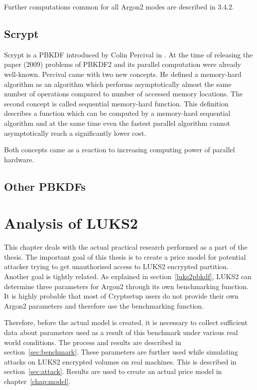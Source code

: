 \documentclass[nolof]{fithesis3}
\begin{document}
Further computations common for all Argon2 modes are described in \parencite{argon2draft}{3.4.2}.

\section{Scrypt}
Scrypt is a PBKDF introduced by Colin Percival in \parencite{memoryhard}. At the time of releasing the paper (2009) problems of PBKDF2 and its parallel computation were already well-known. Percival came with two new concepts. He defined a memory-hard algorithm as an algorithm which performs asymptotically almost the same number of operations compared to number of accessed memory locations. The second concept is called sequential memory-hard function. This definition describes a function which can be computed by a memory-hard sequential algorithm and at the same time even the fastest parallel algorithm cannot asymptotically reach a significantly lower cost.

Both concepts came as a reaction to increasing computing power of parallel hardware. 

\section{Other PBKDFs}

\chapter{Analysis of LUKS2}
\label{chap:analysis}
This chapter deals with the actual practical research performed as a part of the thesis. The important goal of this thesis is to create a price model for potential attacker trying to get unauthorised access to LUKS2 encrypted partition. Another goal is tightly related. As explained in section~\ref{luks2pbkdf}, LUKS2 can determine three parameters for Argon2 through its own benchmarking function. It is highly probable that most of Cryptsetup users do not provide their own Argon2 parameters and therefore use the benchmarking function.

Therefore, before the actual model is created, it is necessary to collect sufficient data about parameters used as a result of  this benchmark under various real world conditions. The process and results are described in section~\ref{sec:benchmark}. These parameters are further used while simulating attacks on LUKS2 encrypted volumes on real machines.  This is described in section~\ref{sec:attack}. Results are used to create an actual price model in chapter~\ref{chap:model}.
\end{document}
